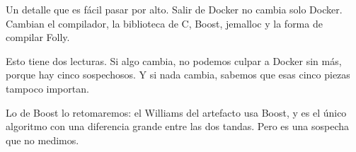 Un detalle que es fácil pasar por alto. Salir de Docker no cambia solo Docker. Cambian el compilador, la biblioteca de C, Boost, jemalloc y la forma de compilar Folly.

Esto tiene dos lecturas. Si algo cambia, no podemos culpar a Docker sin más, porque hay cinco sospechosos. Y si nada cambia, sabemos que esas cinco piezas tampoco importan.

Lo de Boost lo retomaremos: el Williams del artefacto usa Boost, y es el único algoritmo con una diferencia grande entre las dos tandas. Pero es una sospecha que no medimos.
